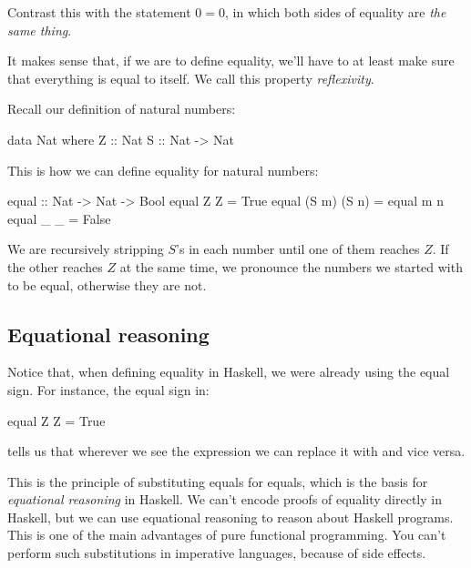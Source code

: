 \documentclass[DaoFP]{subfiles}
\begin{document}
Contrast this with the statement $0 = 0$, in which both sides of equality are \emph{the same thing}. 

It makes sense that, if we are to define equality, we'll have to at least make sure that everything is equal to itself. We call this property \emph{reflexivity}. 

Recall our definition of natural numbers:
\begin{haskell}
data Nat where
  Z :: Nat
  S :: Nat -> Nat
\end{haskell}

This is how we can define equality for natural numbers:
\begin{haskell}
equal :: Nat -> Nat -> Bool
equal Z Z = True
equal (S m) (S n) = equal m n
equal _ _ = False
\end{haskell}
We are recursively stripping $S$'s in each number until one of them reaches $Z$. If the other reaches $Z$ at the same time, we pronounce the numbers we started with to be equal, otherwise they are not. 

\subsection{Equational reasoning}

Notice that, when defining equality in Haskell, we were already using the equal sign. For instance, the equal sign in:
\begin{haskell}
equal Z Z = True
\end{haskell}
tells us that wherever we see the expression  we can replace it with  and vice versa. 

This is the principle of substituting equals for equals, which is the basis for \emph{equational reasoning} in Haskell. We can't encode proofs of equality directly in Haskell, but we can use equational reasoning to reason about Haskell programs. This is one of the main advantages of pure functional programming. You can't perform such substitutions in imperative languages, because of side effects.
\end{document}
